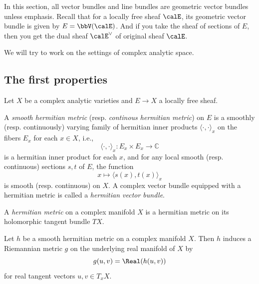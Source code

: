 

In this section, all vector bundles and line bundles are geometric vector bundles unless emphasis.
Recall that for a locally free sheaf $\calE$, its geometric vector bundle is given by $E = \bbV(\calE)$.
And if you take the sheaf of sections of $E$, then you get the dual sheaf $\calE^\vee$ of original sheaf $\calE$.

We will try to work on the settings of complex analytic space.

\subsection{The first properties}

Let \(X\) be a complex analytic varieties and \(E \to X\) a locally free sheaf.

\begin{definition}\label{def:hermitian-metric-on-holomorphic-vector-bundles}
	A \emph{smooth hermitian metric} (resp. \emph{continous hermitian metric}) on \(E\) is a smoothly (resp. continuously) varying family of hermitian inner products \(\langle \cdot, \cdot \rangle_x\) on the fibers \(E_x\) for each \(x \in X\),
	i.e.,
	\[\langle \cdot, \cdot \rangle_x: E_x \times E_x \to \mathbb{C}\]
	is a hermitian inner product for each \(x\), and for any local smooth (resp. continuous) sections \(s,t\) of \(E\), the function
	\[x \mapsto \langle s(x), t(x) \rangle_x\]
	is smooth (resp. continuous) on \(X\).
	A complex vector bundle equipped with a hermitian metric is called a \emph{hermitian vector bundle}.
\end{definition}

\begin{definition}\label{def:hermitian-metric-on-tangent-bundle}
	A \emph{hermitian metric} on a complex manifold \(X\) is a hermitian metric on its holomorphic tangent bundle \(TX\).
\end{definition}

\begin{remark}\label{rmk:Riemannian_metric_induced_by_hermitian_metric}
	Let \(h\) be a smooth hermitian metric on a complex manifold \(X\).
	Then \(h\) induces a Riemannian metric \(g\) on the underlying real manifold of \(X\) by
	\[g(u,v) = \Real(h(u,v))\]
	for real tangent vectors \(u,v \in T_x X\).
\end{remark}

